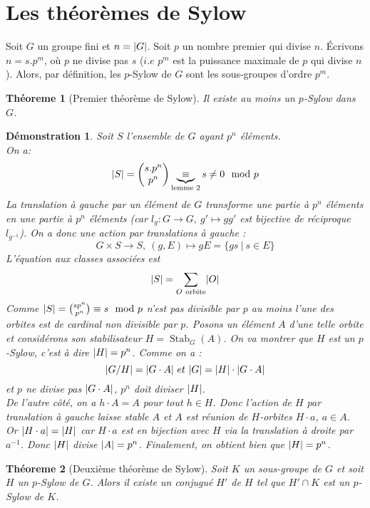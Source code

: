 \documentclass[a4paper, oneside]{report}
\theoremstyle{break}
\newtheorem{thm}{Théoreme}[section] %
\newtheorem*{demonstration}{Démonstration}
\newcommand{\sgs}{sous-groupes }
\newcommand{\x}{\times}
\DeclarePairedDelimiter\abs{\lvert}{\rvert}%
\DeclareMathOperator{\Stab}{Stab}
\newcommand{\ub}{\underbrace}
\begin{document}
\section{Les théorèmes de Sylow}

Soit $G$ un groupe fini et $n = \abs{G}$. Soit $p$ un nombre premier qui divise $n$. Écrivons $n = s.p^m$, où $p$ ne divise pas $s$ ($i.e$ $p^m$ est la puissance maximale de $p$ qui divise $n$). Alors, par définition, les $p$-Sylow de $G$ sont les \sgs d'ordre $p^m$.

\begin{thm}[Premier théorème de Sylow]
Il existe au moins un $p$-Sylow dans $G$.
\end{thm}

\begin{demonstration}
Soit $S$ l'ensemble de $G$ ayant $p^n$ éléments.\\
On a:
\[
\abs{S} = 
\begin{pmatrix}
s.p^n		\\	p^n
\end{pmatrix} 
\ub{\equiv}_{\text{lemme 2}} s \neq 0 \mod p
\]
La translation à gauche par un élément de $G$ transforme une partie à $p^n$ éléments en une partie à $p^n$ éléments (car $l_g : G\rightarrow G,~g'\mapsto gg'$ est bijective de réciproque $l_{g^{-1}}$). On a donc une action par translations à gauche :
$$G\x S \rightarrow S,~(g,E)\mapsto gE = \{gs~|~s\in E\}$$
L'équation aux classes associées est
\[
\abs{S} = \sum_{O~\text{orbite}} \abs{O}
\]
Comme $\abs{S}=\binom{sp^n}{p^n}\equiv s \mod p$ n'est pas divisible par $p$ au moins l'une des orbites est de cardinal non divisible par $p$. Posons un élément $A$ d'une telle orbite et considérons son stabilisateur $H = \Stab_G(A)$. On va montrer que $H$ est un $p$-Sylow, c'est à dire $\abs{H} = p^n$. Comme on a :
$$\abs{G/H} = \abs{G\cdot A}~et~\abs{G}=\abs{H}\cdot\abs{G\cdot A}$$
et $p$ ne divise pas $\abs{G\cdot A}$, $p^n$ doit diviser $\abs{H}$.\\
De l'autre côté, on a $h\cdot A = A$ pour tout $h\in H$. Donc l'action de $H$ par translation à gauche laisse stable $A$ et $A$ est réunion de $H$-orbites $H\cdot a$, $a \in A$.\\
Or $\abs{H\cdot a}=\abs{H}$ car $H\cdot a$ est en bijection avec $H$ via la translation à droite par $a^{-1}$.
Donc $\abs{H}$ divise $\abs{A} = p^n$. Finalement, on obtient bien que $\abs{H} = p^n$.
\end{demonstration}

\begin{thm}[Deuxième théorème de Sylow]
Soit $K$ un sous-groupe de $G$ et soit $H$ un $p$-Sylow de $G$. Alors il existe un conjugué $H'$ de $H$ tel que $H' \cap K$ est un $p$-Sylow de $K$.
\end{thm}
\end{document}

